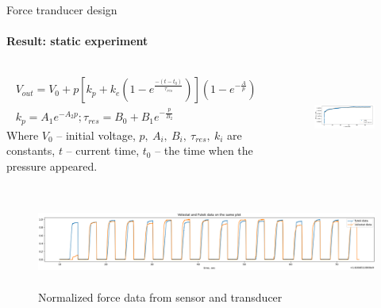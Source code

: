\documentclass[aspectratio=169]{beamer}
\begin{document}
\begin{frame}[t]{Force tranducer design}
    \framesubtitle{Result: static experiment}
    \vspace{-0.5cm}
    \begin{columns}[T,onlytextwidth]
        \begin{column}{0.52\textwidth}
            \begin{eqnarray*}
                V_{out} = V_0 + p[k_p + k_e(1-e^\frac{-(t-t_0)}{\tau_{res}})](1-e^{-\frac{A}{p}}) \\
                k_p = A_1e^{-A_2p}; \tau_{res} = B_0 + B_1e^{-\frac{p}{B_2}}
            \end{eqnarray*}
            Where $V_0$ -- initial voltage, $p,\ A_i,\ B_i,\ \tau_{res},\ k_i$ are constants, $t$ -- current time, $t_0$ -- the time when the pressure appeared.
        \end{column}
        \begin{column}{0.45\textwidth}
            \vspace{-15pt}
            \begin{figure}[H]
                \centering\includegraphics[height=2.8cm,width=1\textwidth,keepaspectratio]{least_square_model.png}
                \label{fig:least_square_model.png}
            \end{figure}
        \end{column}
    \end{columns}
    \vspace{-11pt}
    \begin{figure}[H]
        \centering\includegraphics[height=3cm,width=1\textwidth,keepaspectratio]{pikes.png}
        \caption*{Normalized force data from sensor and transducer}
        \label{fig:pikes.png}
    \end{figure}
\end{frame}
\end{document}
